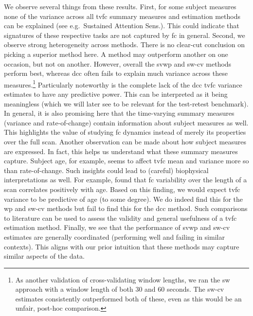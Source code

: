 We observe several things from these results.
%
First, for some subject measures none of the variance across all \gls{tvfc} summary measures and estimation methods can be explained (see e.g.~Sustained Attention Sens.).
This could indicate that signatures of these respective tasks are not captured by \gls{fc} in general.
%
Second, we observe strong heterogeneity across methods.
There is no clear-cut conclusion on picking a superior method here.
A method may outperform another on one occasion, but not on another.
However, overall the \gls{svwp} and \gls{sw-cv} methods perform best, whereas \gls{dcc} often fails to explain much variance across these measures.\footnote{As another validation of cross-validating window lengths, we ran the \gls{sw} approach with a window length of both 30 and 60 seconds. The \gls{sw-cv} estimates consistently outperformed both of these, even as this would be an unfair, post-hoc comparison.}
Particularly noteworthy is the complete lack of the \gls{dcc} \gls{tvfc} variance estimates to have any predictive power.
This can be interpreted as it being meaningless (which we will later see to be relevant for the test-retest benchmark).
%
In general, it is also promising here that the time-varying summary measures (variance and rate-of-change) contain information about subject measures as well.
This highlights the value of studying \gls{fc} dynamics instead of merely its properties over the full scan.
%
Another observation can be made about how subject measures are expressed.
In fact, this helps us understand what these summary measures capture.
Subject age, for example, seems to affect \gls{tvfc} mean and variance more so than rate-of-change.
Such insights could lead to (careful) biophysical interpretations as well.
For example, \textcite{Hutchison2015} found that \gls{fc} variability over the length of a scan correlates positively with age.
Based on this finding, we would expect \gls{tvfc} variance to be predictive of age (to some degree).
We do indeed find this for the \gls{wp} and \gls{sw-cv} methods but fail to find this for the \gls{dcc} method.
Such comparisons to literature can be used to assess the validity and general usefulness of a \gls{tvfc} estimation method.
%
Finally, we see that the performance of \gls{svwp} and \gls{sw-cv} estimates are generally coordinated (performing well and failing in similar contexts).
This aligns with our prior intuition that these methods may capture similar aspects of the data.


